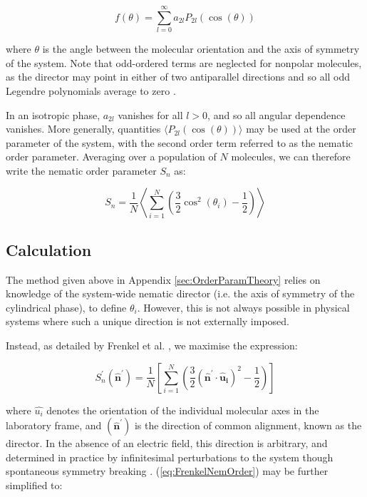 \documentclass[11pt, a4paper]{article} %
\begin{document}
\begin{appendices}
\begin{equation}
f(\theta) = \sum_{l=0}^{\infty} a_{2l} P_{2l}(\cos(\theta))
\end{equation}

where $\theta$ is the angle between the molecular orientation and the axis of symmetry of the system. Note that odd-ordered terms are neglected for nonpolar molecules, as the director may point in either of two antiparallel directions and so all odd Legendre polynomials average to zero \cite{Parsons1979}.

In an isotropic phase, $a_{2l}$ vanishes for all $l>0$, and so all angular dependence vanishes. More generally,  quantities $\langle P_{2l}(\cos(\theta)) \rangle$ may be used at the order parameter of the system, with the second order term referred to as the nematic order parameter. Averaging over a population of $N$ molecules, we can therefore write the nematic order parameter $S_{n}$ as:

\begin{equation}
S_{n} = \frac{1}{N} \left\langle \sum_{i=1}^{N} \left( \frac{3}{2} \cos^{2}(\theta_{i})-\frac{1}{2} \right) \right\rangle
\end{equation}

\subsection{Calculation}\label{sec:OrderParamCalc}
The method given above in Appendix \ref{sec:OrderParamTheory} relies on knowledge of the system-wide nematic director (i.e. the axis of symmetry of the cylindrical phase), to define $\theta_{i}$. However, this is not always possible in physical systems where such a unique direction is not externally imposed.

Instead, as detailed by Frenkel et al. \cite{Frenkel1985}, we maximise the expression:

\begin{equation} \label{eq:FrenkelNemOrder}
S^{\prime}_{n}(\boldsymbol{\hat{n}^{\prime}}) = \frac{1}{N} \left[ \sum_{i=1}^{N} \left( \frac{3}{2} (\boldsymbol{\hat{n}^{\prime}} \cdot \boldsymbol{\hat{u}_{i}})^{2}-\frac{1}{2} \right) \right]
\end{equation}

where $\hat{u_{i}}$ denotes the orientation of the individual molecular axes in the laboratory frame, and $(\boldsymbol{\hat{n}^{\prime}})$ is the direction of common alignment, known as the director. In the absence of an electric field, this direction is arbitrary, and determined in practice by infinitesimal perturbations to the system though spontaneous symmetry breaking \cite{Forster2018}. (\ref{eq:FrenkelNemOrder}) may be further simplified to:


\end{appendices}
\end{document}

